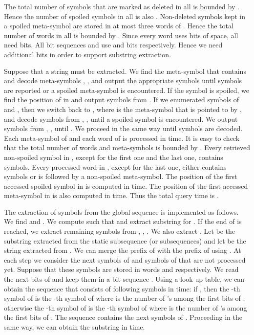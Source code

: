 \documentclass[11pt]{article}\usepackage{fullpage}
\begin{document}
The total number of symbols that are marked as deleted in all  is bounded by . Hence the number of spoiled symbols in all  is also . 
Non-deleted symbols kept in a spoiled meta-symbol are stored in at most three words of . Hence the total number of words in all  is bounded by . Since every word uses  bits of space, all  need   bits.  All bit sequences  and  use  and  bits respectively. Hence we need 
 additional bits in order to support substring extraction.

 


Suppose that a string  must be extracted. We find the meta-symbol  that contains  and decode meta-symbols , ,  and output the appropriate symbols until  symbols are reported or a spoiled meta-symbol is encountered. If the symbol  
is spoiled, we find the position of  in  and output  symbols from . If we enumerated symbols of  and , then we switch back to , where  is the meta-symbol that is pointed to by , and decode symbols from , ,  until a spoiled symbol is encountered. We output symbols from , ,  until .  
We proceed in the same way until  symbols are decoded. 
Each meta-symbol of  and each word of  is processed in  time. It is easy to check that the total number of words and meta-symbols  is bounded by . Every retrieved non-spoiled symbol in , except for the first one and the last one, contains  symbols. Every processed word in , except for the last one, either contains  symbols or is followed by a non-spoiled meta-symbol.  The position of the first accessed spoiled symbol in  is computed in  time. The position of the first accessed meta-symbol in  is also computed in  time.  Thus the total query time is . 


 The extraction of  symbols  from the global sequence  is implemented as follows. We find  and . We compute   such that  and extract substring  for . If the end of  is reached, we extract remaining symbols from , , . 
We also extract . Let  be the substring extracted from the static subsequence (or subsequences) and let  be the string extracted from . We can merge the prefix of  with the prefix of  using . 
At each step we consider the next  symbols of  and  symbols of  that are not processed yet. Suppose that these symbols are stored in words  and  respectively.  We read the next  bits of  and keep them in a bit sequence . Using a look-up table, we can obtain the sequence  that consists of  following symbols in  time: if , then the -th symbol of  is the -th symbol of  where  is the number of 's among the first  bits of ; otherwise the -th symbol of  is the -th symbol of  where  is the number of 's among the first  bits of . The sequence  contains the next  symbols of . Proceeding in the same way, we can obtain the substring  in  time. 
\end{document}

